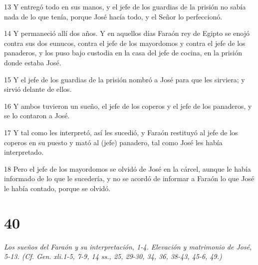 \par 13 Y entregó todo en sus manos, y el jefe de los guardias de la prisión no sabía nada de lo que tenía, porque José hacía todo, y el Señor lo perfeccionó.
\par 14 Y permaneció allí dos años. Y en aquellos días Faraón rey de Egipto se enojó contra sus dos eunucos, contra el jefe de los mayordomos y contra el jefe de los panaderos, y los puso bajo custodia en la casa del jefe de cocina, en la prisión donde estaba José.
\par 15 Y el jefe de los guardias de la prisión nombró a José para que les sirviera; y sirvió delante de ellos.
\par 16 Y ambos tuvieron un sueño, el jefe de los coperos y el jefe de los panaderos, y se lo contaron a José.
\par 17 Y tal como les interpretó, así les sucedió, y Faraón restituyó al jefe de los coperos en su puesto y mató al (jefe) panadero, tal como José les había interpretado.
\par 18 Pero el jefe de los mayordomos se olvidó de José en la cárcel, aunque le había informado de lo que le sucedería, y no se acordó de informar a Faraón lo que José le había contado, porque se olvidó.

\chapter{40}

\par \textit{Los sueños del Faraón y su interpretación, 1-4. Elevación y matrimonio de José, 5-13. (Cf. Gen. xli.1-5, 7-9, 14 ss., 25, 29-30, 34, 36, 38-43, 45-6, 49.)}

